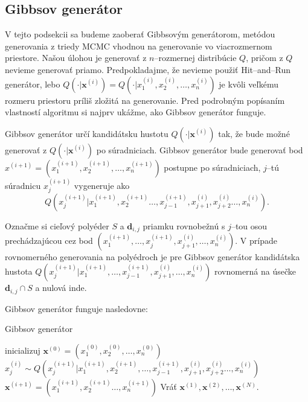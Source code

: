 \subsection{Gibbsov generátor}

V tejto podsekcii sa budeme zaoberať Gibbsovým generátorom, metódou generovania z triedy MCMC vhodnou na generovanie vo viacrozmernom priestore.
Našou úlohou je generovať z $n$--rozmernej distribúcie $Q$, pričom z $Q$ nevieme generovať priamo. Predpokladajme, že nevieme použiť Hit--and--Run generátor, lebo $Q(\cdot|\mathbf x^{(i)})=Q(\cdot|x^{(i)}_1, x^{(i)}_2, \dots, x^{(i)}_n)$ je kvôli veľkému rozmeru priestoru príliš zložitá na generovanie. Pred podrobným popísaním vlastností algoritmu si najprv ukážme, ako Gibbsov generátor funguje.

Gibbsov generátor určí kandidátsku hustotu $Q(\cdot|\mathbf x^{(i)})$ tak, že bude možné generovať z $Q(\cdot|\mathbf x^{(i)})$ po súradniciach.
Gibbsov generátor bude generovať bod $x^{(i+1)}=(x^{(i+1)}_1, x^{(i+1)}_2, \dots, x^{(i+1)}_n)$ postupne po súradniciach, $j$--tú súradnicu $x^{(i+1)}_j$ vygeneruje ako $$Q(x^{(i+1)}_j | x^{(i+1)}_1, x^{(i+1)}_2 \dots, x^{(i+1)}_{j-1}, x^{(i)}_{j+1}, x^{(i)}_{j+2} \dots, x^{(i)}_n).$$

Označme si cieľový polyéder $S$ a $\mathbf d_{i,j}$ priamku rovnobežnú s $j$--tou osou prechádzajúcou cez bod $(x^{(i+1)}_1, \dots, x^{(i+1)}_{j}, x^{(i)}_{j+1}, \dots, x^{(i)}_n)$.
V prípade rovnomerného generovania na polyédroch je pre Gibbsov generátor kandidátska hustota $Q(x^{(i+1)}_j | x^{(i+1)}_1, \dots, x^{(i+1)}_{j-1}, x^{(i)}_{j+1}, \dots, x^{(i)}_n)$ rovnomerná na úsečke $\mathbf d_{i,j} \cap S$ a nulová inde.

Gibbsov generátor funguje nasledovne:

\begin{algorithm}[H]
	\caption{Gibbsov generátor \cite{mcmc_intro_mackay}}
	\label{gibbs}
	\begin{algorithmic}[1]
		\State inicializuj $\mathbf x^{(0)} = (x^{(0)}_1, x^{(0)}_2, \dots, x^{(0)}_n)$
				\State $x^{(i)}_j \sim Q(x^{(i+1)}_j | x^{(i+1)}_1, x^{(i+1)}_2, \dots, x^{(i+1)}_{j-1}, x^{(i)}_{j+1}, x^{(i)}_{j+2} \dots, x^{(i)}_n)$
			\EndFor
			\State $\mathbf x^{(i+1)}= (x^{(i+1)}_1, x^{(i+1)}_2 \dots, x^{(i+1)}_n)$
		\EndFor
		\State Vráť ${\mathbf x^{(1)},\mathbf x^{(2)},\dots,\mathbf x^{(N)}}$.
	\end{algorithmic}
\end{algorithm}

